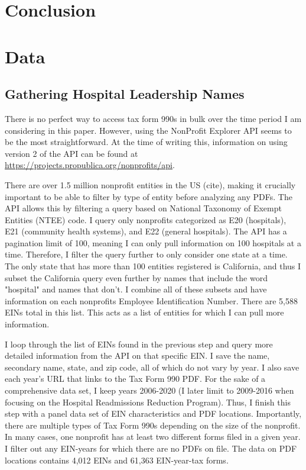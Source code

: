 \documentclass[12pt]{article}
\begin{document}
    \section{Conclusion}

	
	\newpage
	\appendix

    \section{Data}\label{appendixdata}

    \subsection{Gathering Hospital Leadership Names}

    There is no perfect way to access tax form 990s in bulk over the time period I am considering in this paper. However, using the NonProfit Explorer API seems to be the most straightforward. At the time of writing this, information on using version 2 of the API can be found at \hyperlink{https://projects.propublica.org/nonprofits/api}{https://projects.propublica.org/nonprofits/api}. 
    
    There are over 1.5 million nonprofit entities in the US (cite), making it crucially important to be able to filter by type of entity before analyzing any PDFs. The API allows this by filtering a query based on National Taxonomy of Exempt Entities (NTEE) code. I query only nonprofits categorized as E20 (hospitals), E21 (community health systems), and E22 (general hospitals). The API has a pagination limit of 100, meaning I can only pull information on 100 hospitals at a time. Therefore, I filter the query further to only consider one state at a time. The only state that has more than 100 entities registered is California, and thus I subset the California query even further by names that include the word "hospital" and names that don't. I combine all of these subsets and have information on each nonprofits Employee Identification Number. There are 5,588 EINs total in this list. This acts as a list of entities for which I can pull more information. 

    I loop through the list of EINs found in the previous step and query more detailed information from the API on that specific EIN. I save the name, secondary name, state, and zip code, all of which do not vary by year. I also save each year's URL that links to the Tax Form 990 PDF. For the sake of a comprehensive data set, I keep years 2006-2020 (I later limit to 2009-2016 when focusing on the Hospital Readmissions Reduction Program). Thus, I finish this step with a panel data set of EIN characteristics and PDF locations. Importantly, there are multiple types of Tax Form 990s depending on the size of the nonprofit. In many cases, one nonprofit has at least two different forms filed in a given year. I filter out any EIN-years for which there are no PDFs on file. The data on PDF locations contains 4,012 EINs and 61,363 EIN-year-tax forms.
\end{document}
